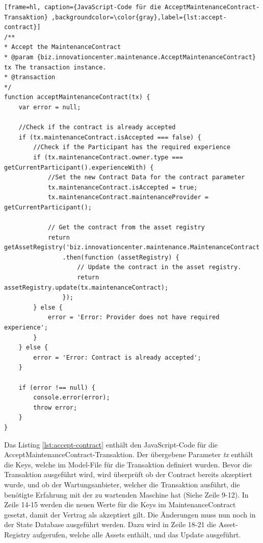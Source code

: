 \begin{lstfloat}
\begin{lstlisting}[frame=hl, caption={JavaScript-Code für die AcceptMaintenanceContract-Transaktion} ,backgroundcolor=\color{gray},label={lst:accept-contract}]
/**
* Accept the MaintenanceContract
* @param {biz.innovationcenter.maintenance.AcceptMaintenanceContract} tx The transaction instance.
* @transaction
*/
function acceptMaintenanceContract(tx) {
    var error = null;

    //Check if the contract is already accepted
    if (tx.maintenanceContract.isAccepted === false) {
        //Check if the Participant has the required experience
        if (tx.maintenanceContract.owner.type === getCurrentParticipant().experienceWith) {
            //Set the new Contract Data for the contract parameter
            tx.maintenanceContract.isAccepted = true;
            tx.maintenanceContract.maintenanceProvider = getCurrentParticipant();

            // Get the contract from the asset registry
            return getAssetRegistry('biz.innovationcenter.maintenance.MaintenanceContract')
                .then(function (assetRegistry) {
                    // Update the contract in the asset registry.
                    return assetRegistry.update(tx.maintenanceContract);
                });
        } else {
            error = 'Error: Provider does not have required experience';
        }
    } else {
        error = 'Error: Contract is already accepted';
    }

    if (error !== null) {
        console.error(error);
        throw error;
    }
}
\end{lstlisting} 
\end{lstfloat}

Das Listing \ref{lst:accept-contract} enthält den JavaScript-Code für die AcceptMaintenanceContract-Transaktion. Der übergebene Parameter \textit{tx} enthält die Keys, welche im Model-File für die Transaktion definiert wurden. Bevor die Transaktion ausgeführt wird, wird überprüft ob der Contract bereits akzeptiert wurde, und ob der Wartungsanbieter, welcher die Transaktion ausführt, die benötigte Erfahrung mit der zu wartenden Maschine hat (Siehe Zeile 9-12). In Zeile 14-15 werden die neuen Werte für die Keys im MaintenanceContract gesetzt, damit der Vertrag als akzeptiert gilt. Die Änderungen muss nun noch in der State Database ausgeführt werden. Dazu wird in Zeile 18-21 die Asset-Registry aufgerufen, welche alle Assets enthält, und das Update ausgeführt.

